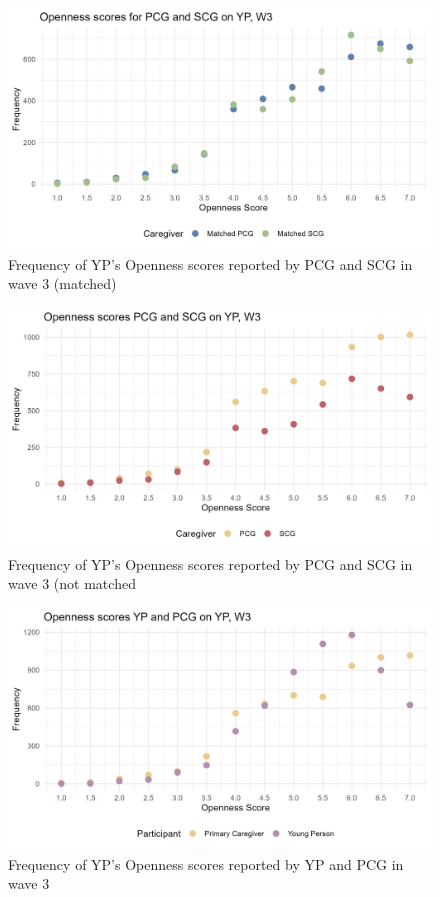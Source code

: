 \documentclass[a4paper]{article}
\begin{document}
\begin{figure}[htbp] 
    \centering
    \includegraphics[width=1\linewidth]{Matched Openness by participant w3.jpeg}
    \caption{Frequency of YP's Openness scores reported by PCG and SCG in wave 3 (matched)}
    \label{}
\end{figure}

\begin{figure}[htbp] 
    \centering
    \includegraphics[width=1\linewidth]{Frequency of Openness by participant w3.jpeg}
    \caption{Frequency of YP's Openness scores reported by PCG and SCG in wave 3 (not matched}
    \label{}
\end{figure}

\begin{figure}[htbp] 
    \centering
    \includegraphics[width=1\linewidth]{Frequency of Openness by participant w3a.jpeg}
    \caption{Frequency of YP's Openness scores reported by YP and PCG in wave 3}
    \label{}
\end{figure}
\end{document}
